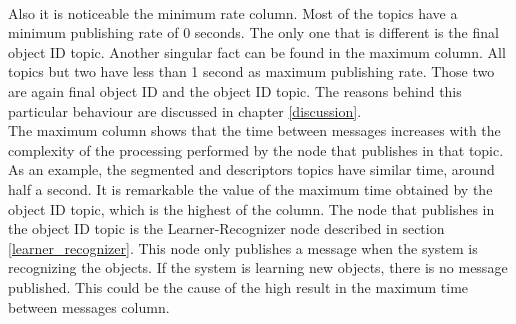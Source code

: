 			\\


			Also it is noticeable the minimum rate column. 
			Most of the topics have a minimum publishing rate of 0 seconds.
			The only one that is different is the final object ID topic. 
			Another singular fact can be found in the maximum column. 
			All topics but two have less than 1 second as maximum publishing rate. 
			Those two are again final object ID and the object ID topic. 
			The reasons behind this particular behaviour are discussed in chapter \ref{discussion}. 
			\\

			The maximum column shows that the time between messages increases with the complexity of the processing performed by the node that publishes in that topic. 
			As an example, the segmented and descriptors topics have similar time, around half a second. 
			It is remarkable the value of the maximum time obtained by the object ID topic, which is the highest of the column. 
			The node that publishes in the object ID topic is the Learner-Recognizer node described in section \ref{learner_recognizer}.
			This node only publishes a message when the system is recognizing the objects. 
			If the system is learning new objects, there is no message published. 
			This could be the cause of the high result in the maximum time between messages column. 
			


